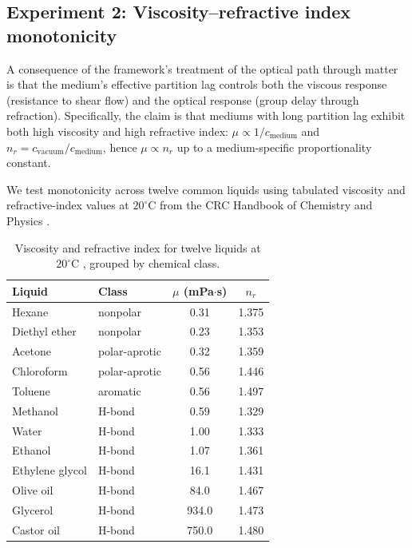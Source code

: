 \documentclass[11pt,twocolumn,a4paper]{article}
\theoremstyle{definition}
\theoremstyle{remark}
\begin{document}
\subsection{Experiment 2: Viscosity--refractive index monotonicity}
\label{sec:exp_viscosity}

A consequence of the framework's treatment of the optical path through matter is that the medium's effective partition lag controls both the viscous response (resistance to shear flow) and the optical response (group delay through refraction). Specifically, the claim is that mediums with long partition lag exhibit both high viscosity and high refractive index: $\mu \propto 1/c_{\mathrm{medium}}$ and $n_r = c_{\mathrm{vacuum}}/c_{\mathrm{medium}}$, hence $\mu \propto n_r$ up to a medium-specific proportionality constant.

We test monotonicity across twelve common liquids using tabulated viscosity and refractive-index values at $20^\circ$C from the CRC Handbook of Chemistry and Physics \citep{haynes2016}.

\begin{table}[H]
\centering\small
\caption{Viscosity and refractive index for twelve liquids at $20^\circ$C \citep{haynes2016}, grouped by chemical class.}
\label{tab:viscosity}
\begin{tabular}{llcc}
\toprule
Liquid & Class & $\mu$ (mPa$\cdot$s) & $n_r$\\
\midrule
Hexane         & nonpolar       & 0.31  & 1.375\\
Diethyl ether  & nonpolar       & 0.23  & 1.353\\
Acetone        & polar-aprotic  & 0.32  & 1.359\\
Chloroform     & polar-aprotic  & 0.56  & 1.446\\
Toluene        & aromatic       & 0.56  & 1.497\\
Methanol       & H-bond         & 0.59  & 1.329\\
Water          & H-bond         & 1.00  & 1.333\\
Ethanol        & H-bond         & 1.07  & 1.361\\
Ethylene glycol& H-bond         & 16.1  & 1.431\\
Olive oil      & H-bond         & 84.0  & 1.467\\
Glycerol       & H-bond         & 934.0 & 1.473\\
Castor oil     & H-bond         & 750.0 & 1.480\\
\bottomrule
\end{tabular}
\end{table}
\end{document}
